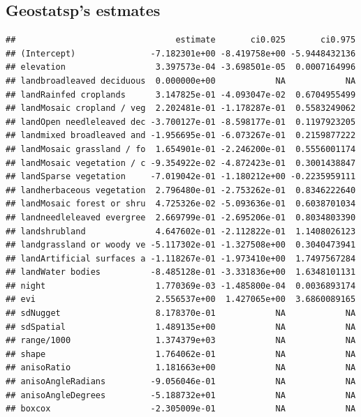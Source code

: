 \documentclass[
]{article}
\newenvironment{Shaded}{\begin{snugshade}}{\end{snugshade}}
\newcommand{\DecValTok}[1]{\textcolor[rgb]{0.00,0.00,0.81}{#1}}
\newcommand{\FunctionTok}[1]{\textcolor[rgb]{0.13,0.29,0.53}{\textbf{#1}}}
\newcommand{\NormalTok}[1]{#1}
\newcommand{\OtherTok}[1]{\textcolor[rgb]{0.56,0.35,0.01}{#1}}
\newcommand{\SpecialCharTok}[1]{\textcolor[rgb]{0.81,0.36,0.00}{\textbf{#1}}}
\newcommand{\StringTok}[1]{\textcolor[rgb]{0.31,0.60,0.02}{#1}}
\begin{document}
\hypertarget{geostatsps-estmates-1}{%
\subsection{Geostatsp's estmates}\label{geostatsps-estmates-1}}

\begin{Shaded}
\end{Shaded}

\begin{verbatim}
##                                estimate       ci0.025       ci0.975
## (Intercept)               -7.182301e+00 -8.419758e+00 -5.9448432136
## elevation                  3.397573e-04 -3.698501e-05  0.0007164996
## landbroadleaved deciduous  0.000000e+00            NA            NA
## landRainfed croplands      3.147825e-01 -4.093047e-02  0.6704955499
## landMosaic cropland / veg  2.202481e-01 -1.178287e-01  0.5583249062
## landOpen needleleaved dec -3.700127e-01 -8.598177e-01  0.1197923205
## landmixed broadleaved and -1.956695e-01 -6.073267e-01  0.2159877222
## landMosaic grassland / fo  1.654901e-01 -2.246200e-01  0.5556001174
## landMosaic vegetation / c -9.354922e-02 -4.872423e-01  0.3001438847
## landSparse vegetation     -7.019042e-01 -1.180212e+00 -0.2235959111
## landherbaceous vegetation  2.796480e-01 -2.753262e-01  0.8346222640
## landMosaic forest or shru  4.725326e-02 -5.093636e-01  0.6038701034
## landneedleleaved evergree  2.669799e-01 -2.695206e-01  0.8034803390
## landshrubland              4.647602e-01 -2.112822e-01  1.1408026123
## landgrassland or woody ve -5.117302e-01 -1.327508e+00  0.3040473941
## landArtificial surfaces a -1.118267e-01 -1.973410e+00  1.7497567284
## landWater bodies          -8.485128e-01 -3.331836e+00  1.6348101131
## night                      1.770369e-03 -1.485800e-04  0.0036893174
## evi                        2.556537e+00  1.427065e+00  3.6860089165
## sdNugget                   8.178370e-01            NA            NA
## sdSpatial                  1.489135e+00            NA            NA
## range/1000                 1.374379e+03            NA            NA
## shape                      1.764062e-01            NA            NA
## anisoRatio                 1.181663e+00            NA            NA
## anisoAngleRadians         -9.056046e-01            NA            NA
## anisoAngleDegrees         -5.188732e+01            NA            NA
## boxcox                    -2.305009e-01            NA            NA
\end{verbatim}
\end{document}
